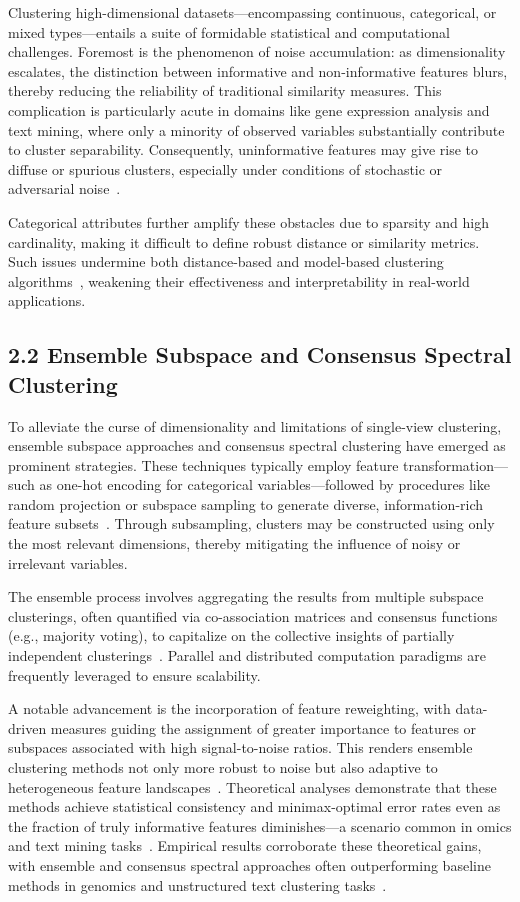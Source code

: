 \documentclass[11pt]{article}
\begin{document}
Clustering high-dimensional datasets—encompassing continuous, categorical, or mixed types—entails a suite of formidable statistical and computational challenges. Foremost is the phenomenon of noise accumulation: as dimensionality escalates, the distinction between informative and non-informative features blurs, thereby reducing the reliability of traditional similarity measures. This complication is particularly acute in domains like gene expression analysis and text mining, where only a minority of observed variables substantially contribute to cluster separability. Consequently, uninformative features may give rise to diffuse or spurious clusters, especially under conditions of stochastic or adversarial noise~\cite{ref116}. 

Categorical attributes further amplify these obstacles due to sparsity and high cardinality, making it difficult to define robust distance or similarity metrics. Such issues undermine both distance-based and model-based clustering algorithms~\cite{ref116}, weakening their effectiveness and interpretability in real-world applications.

\subsection{2.2 Ensemble Subspace and Consensus Spectral Clustering}

To alleviate the curse of dimensionality and limitations of single-view clustering, ensemble subspace approaches and consensus spectral clustering have emerged as prominent strategies. These techniques typically employ feature transformation—such as one-hot encoding for categorical variables—followed by procedures like random projection or subspace sampling to generate diverse, information-rich feature subsets~\cite{ref96, ref116}. Through subsampling, clusters may be constructed using only the most relevant dimensions, thereby mitigating the influence of noisy or irrelevant variables.

The ensemble process involves aggregating the results from multiple subspace clusterings, often quantified via co-association matrices and consensus functions (e.g., majority voting), to capitalize on the collective insights of partially independent clusterings~\cite{ref97, ref101}. Parallel and distributed computation paradigms are frequently leveraged to ensure scalability.

A notable advancement is the incorporation of feature reweighting, with data-driven measures guiding the assignment of greater importance to features or subspaces associated with high signal-to-noise ratios. This renders ensemble clustering methods not only more robust to noise but also adaptive to heterogeneous feature landscapes~\cite{ref99, ref116}. Theoretical analyses demonstrate that these methods achieve statistical consistency and minimax-optimal error rates even as the fraction of truly informative features diminishes—a scenario common in omics and text mining tasks~\cite{ref96, ref116}. Empirical results corroborate these theoretical gains, with ensemble and consensus spectral approaches often outperforming baseline methods in genomics and unstructured text clustering tasks~\cite{ref116}.
\end{document}
